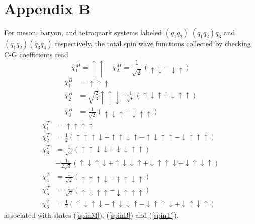 \documentclass[prd,twocolumn,floatfix,nofootinbib]{revtex4}
\begin{document}
\section*{Appendix B}\label{AppendixB}
\setcounter{equation}{0}
\renewcommand{\theequation}{B\arabic{equation}}
For meson, baryon, and tetraquark systems labeled $(q_{1}\bar{q}_{2})$ $(q_{1}q_{2})q_{3}$ and $(q_{1}q_{2})(\bar{q}_{3}\bar{q}_{4})$ respectively, 
the total spin wave functions collected by checking C-G coefficients read
\begin{equation}\label{pspinM}
    \chi_{1}^{M}=\uparrow\uparrow \quad \chi_{2}^{M}=\frac{1}{\sqrt{2}} \left(\uparrow\downarrow-\downarrow\uparrow\right)
\end{equation}
\begin{equation}\label{pspinB}
    \begin{aligned}
        \chi_{1}^{B}&=\uparrow\uparrow\uparrow \\ 
        \chi_{2}^{B}&=\sqrt{\frac{2}{3}}\uparrow\uparrow\downarrow-\frac{1}{\sqrt{6}} \left(\uparrow\downarrow\uparrow+\downarrow\uparrow\uparrow\right) \\ 
        \chi_{3}^{B}&=\frac{1}{\sqrt{2}} \left(\uparrow\downarrow\uparrow-\downarrow\uparrow\uparrow\right)
    \end{aligned}
\end{equation}
\begin{equation}\label{pspinT}
    \begin{aligned}
        \chi_{1}^{T}&=\uparrow\uparrow\uparrow\uparrow \\ 
        \chi_{2}^{T}&=\frac{1}{2} \left(\uparrow\uparrow\uparrow\downarrow+\uparrow\uparrow\downarrow\uparrow-\uparrow\downarrow\uparrow\uparrow-\downarrow\uparrow\uparrow\uparrow\right) \\ 
        \chi_{3}^{T}&=\frac{1}{\sqrt{3}} \left(\uparrow\uparrow\downarrow\downarrow+\downarrow\downarrow\uparrow\uparrow\right)\\
        &-\frac{1}{2\sqrt{3}} \left(\uparrow\downarrow\uparrow\downarrow+\uparrow\downarrow\downarrow\uparrow+\downarrow\uparrow\uparrow\downarrow+\downarrow\uparrow\downarrow\uparrow\right) \\ 
        \chi_{4}^{T}&=\frac{1}{\sqrt{2}} \left(\uparrow\uparrow\uparrow\downarrow-\uparrow\uparrow\downarrow\uparrow\right) \\ 
        \chi_{5}^{T}&=\frac{1}{\sqrt{2}} \left(\uparrow\downarrow\uparrow\uparrow-\downarrow\uparrow\uparrow\uparrow\right) \\ 
        \chi_{6}^{T}&=\frac{1}{2} \left(\uparrow\downarrow\uparrow\downarrow-\uparrow\downarrow\downarrow\uparrow-\downarrow\uparrow\uparrow\downarrow+\downarrow\uparrow\downarrow\uparrow\right)
    \end{aligned}
\end{equation}
associated with states (\ref{spinM}), (\ref{spinB}) and (\ref{spinT}).
\end{document}
